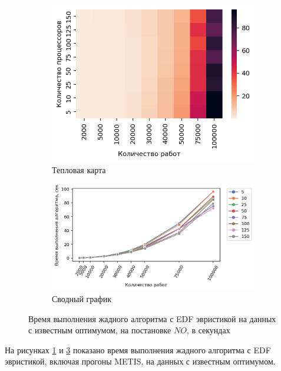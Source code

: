 \begin{figure}[!htbp]
    \centering
    \begin{subfigure}{0.49\textwidth}
        \includegraphics[width=\textwidth]{imgs/ideal_1/NO_EDF/et_heatmap.png}
        \caption{Тепловая карта}
        \label{fig:NO-EDF-exec-time-heatmap}
    \end{subfigure}
    \hfill
    \begin{subfigure}{0.49\textwidth}
        \includegraphics[width=\textwidth]{imgs/ideal_1/NO_EDF/tr_graph.png}
        \caption{Сводный график}
        \label{fig:NO-EDF-exec-time-compiled}
    \end{subfigure}
    \caption{Время выполнения жадного алгоритма с EDF эвристикой на данных с известным оптимумом, на постановке $NO$, в секундах}
\end{figure}

На рисунках \ref{fig:NO-EDF-exec-time-heatmap} и \ref{fig:NO-EDF-exec-time-compiled} показано время выполнения жадного алгоритма с EDF эвристикой, включая прогоны METIS, на данных с известным оптимумом.

